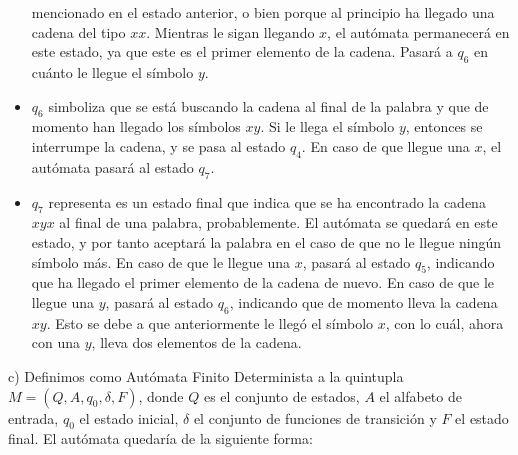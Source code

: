 \documentclass[11pt,a4paper]{article}
\begin{document}
\begin{itemize}
			mencionado en el estado anterior, o bien porque al principio ha llegado una cadena del tipo $xx$. Mientras
			le sigan llegando $x$, el autómata permanecerá en este estado, ya que este es el primer elemento de la
			cadena. Pasará a $q_6$ en cuánto le llegue el símbolo $y$.
			\item $q_6$ simboliza que se está buscando la cadena al final de la palabra y que de momento han llegado
			los símbolos $xy$. Si le llega el símbolo $y$, entonces se interrumpe la cadena, y se pasa al estado $q_4$.
			En caso de que llegue una $x$, el autómata pasará al estado $q_7$.
			\item $q_7$ representa es un estado final que indica que se ha encontrado la cadena $xyx$ al final de una
			palabra, probablemente. El autómata se quedará en este estado, y por tanto aceptará la palabra en el caso
			de que no le llegue ningún símbolo más. En caso de que le llegue una $x$, pasará al estado $q_5$,
			indicando que ha llegado el primer elemento de la cadena de nuevo. En caso de que le llegue una $y$,
			pasará al estado $q_6$, indicando que de momento lleva la cadena $xy$. Esto se debe a que anteriormente
			le llegó el símbolo $x$, con lo cuál, ahora con una $y$, lleva dos elementos de la cadena.
		\end{itemize}				
		
		c) Definimos como Autómata Finito Determinista a la quintupla $M = (Q, A, q_0, \delta, F)$, donde $Q$ es
		el conjunto de estados, $A$ el alfabeto de entrada, $q_0$ el estado inicial, $\delta$ el conjunto de funciones
		de transición y $F$ el estado final. El autómata quedaría de la siguiente forma:
		
		\begin{center}
		\end{center}
		
\end{document}
